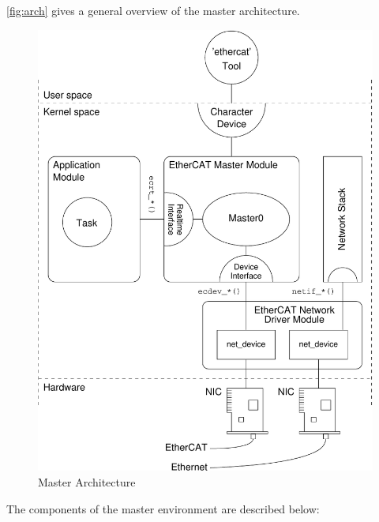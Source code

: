 \documentclass[a4paper,12pt,BCOR6mm,bibtotoc,idxtotoc]{scrbook}
\begin{document}
\autoref{fig:arch} gives a general overview of the master architecture.

\begin{figure}[htbp]
  \centering
  \includegraphics[width=\textwidth]{images/architecture}
  \caption{Master Architecture}
  \label{fig:arch}
\end{figure}

The components of the master environment are described below:
\end{document}

